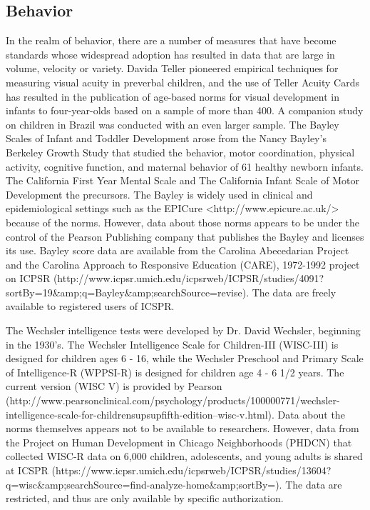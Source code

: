\documentclass[letterpaper,man,apacite]{apa6}
\begin{document}
\subsection{Behavior}

In the realm of behavior, there are a number of measures that have become standards whose widespread adoption has resulted in data that are large in volume, velocity or variety.
Davida Teller pioneered empirical techniques for measuring visual acuity in preverbal children, and the use of Teller Acuity Cards has resulted in the publication of age-based norms for visual development in infants to four-year-olds \cite{mayer_monocular_1995} based on a sample of more than 400.
A companion study on children in Brazil \cite{salomao_large_1995} was conducted with an even larger sample.
The Bayley Scales of Infant and Toddler Development \cite{bayley2006bayley} arose from the Nancy Bayley's Berkeley Growth Study \cite{jones_berkeley_1941} that studied the behavior, motor coordination, physical activity, cognitive function, and maternal behavior of 61 healthy newborn infants.
The California First Year Mental Scale \cite{bayley1933california} and The California Infant Scale of Motor Development \cite{bayley1936california} the precursors.
The Bayley is widely used in clinical and epidemiological settings such as the EPICure <http://www.epicure.ac.uk/> because of the norms.
However, data about those norms appears to be under the control of the Pearson Publishing company that publishes the Bayley and licenses its use.
Bayley score data are available from the Carolina Abecedarian Project and the Carolina Approach to Responsive Education (CARE), 1972-1992 project on ICPSR (http://www.icpsr.umich.edu/icpsrweb/ICPSR/studies/4091?sortBy=19&amp;q=Bayley&amp;searchSource=revise).
The data are freely available to registered users of ICSPR. 

The Wechsler intelligence tests were developed by Dr. David Wechsler, beginning in the 1930's. The Wechsler Intelligence Scale for Children-III (WISC-III) is designed for children ages 6 - 16, while the Wechsler Preschool and Primary Scale of Intelligence-R (WPPSI-R) is designed for children age 4 - 6 1/2 years.
The current version (WISC V) is provided by Pearson (http://www.pearsonclinical.com/psychology/products/100000771/wechsler-intelligence-scale-for-childrensupsupfifth-edition--wisc-v.html).
Data about the norms themselves appears not to be available to researchers.
However, data from the Project on Human Development in Chicago Neighborhoods (PHDCN) that collected WISC-R data on 6,000 children, adolescents, and young adults is shared at ICSPR (https://www.icpsr.umich.edu/icpsrweb/ICPSR/studies/13604?q=wisc&amp;searchSource=find-analyze-home&amp;sortBy=). 
The data are restricted, and thus are only available by specific authorization.
\end{document}
